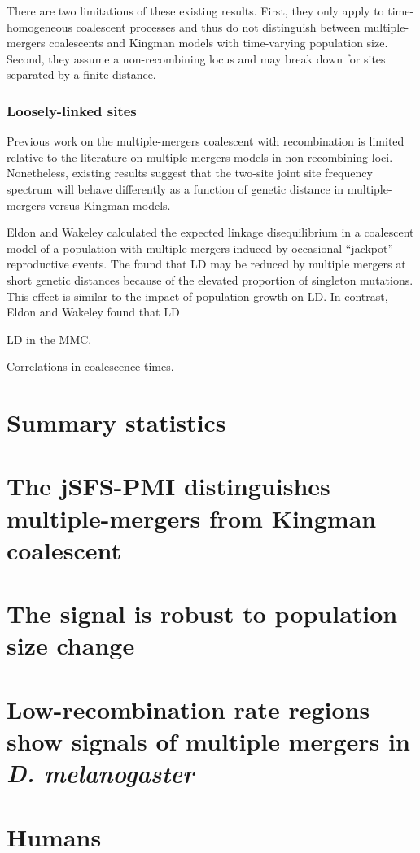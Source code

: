 \documentclass[11pt, letterpaper]{article}   	%
\begin{document}
There are two limitations of these existing results.
First, they only apply to time-homogeneous coalescent processes and thus do not distinguish between multiple-mergers coalescents and Kingman models with time-varying population size.
Second, they assume a non-recombining locus and may break down for sites separated by a finite distance.

\subsubsection*{Loosely-linked sites}

Previous work on the multiple-mergers coalescent with recombination is limited relative to the literature on multiple-mergers models in non-recombining loci.
Nonetheless, existing results suggest that the two-site joint site frequency spectrum will behave differently as a function of genetic distance in multiple-mergers versus Kingman models.

Eldon and Wakeley \cite{} calculated the expected linkage disequilibrium in a coalescent model of a population with multiple-mergers induced by occasional ``jackpot'' reproductive events.
The found that LD may be reduced by multiple mergers at short genetic distances because of the elevated proportion of singleton mutations.
This effect is similar to the impact of population growth on LD.
In contrast, Eldon and Wakeley found that LD

LD in the MMC.

Correlations in coalescence times.

\section*{Summary statistics}

\section*{The jSFS-PMI distinguishes multiple-mergers from Kingman coalescent}

\section*{The signal is robust to population size change}

\section*{Low-recombination rate regions show signals of multiple mergers in \textit{D. melanogaster}}

\section*{Humans}
\end{document}
